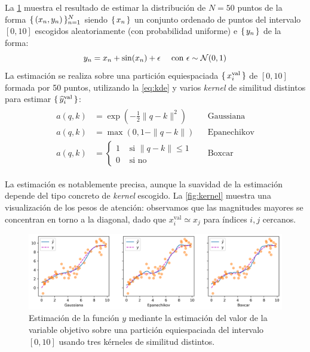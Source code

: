 La \cref{fig:regression} muestra el resultado de estimar la distribución de \( N = 50 \) puntos de la forma \( \{\,(x_{n}, y_{n})\,\}_{n = 1}^N \) siendo \( \{\,x_{n}\,\} \) un conjunto ordenado de puntos del intervalo \( [0, 10] \) escogidos aleatoriamente (con probabilidad uniforme) e \( \{\,y_n\,\} \) de la forma: 
\[
    y_{n} = x_{n} + \sin(x_{n}) + \epsilon \quad \text{ con \( \epsilon \sim \mathcal{N}(0, 1)\)}
\]
La estimación se realiza sobre una partición equiespaciada \( \{\,x^\text{val}_{i}\,\} \) de \( [0, 10] \) formada por 50 puntos, utilizando la \cref{eq:kde} y varios \textit{kernel} de similitud distintos para estimar \( \{\,\widehat{y}^\text{val}_{i}\,\} \):
\[
    \begin{split}\begin{aligned}
    a(q, k) & = \exp\left(-\frac{1}{2} \|q - k\|^2 \right) && \mathrm{Gaussiana} \\
    a(q, k) & = \max\left(0, 1 - \|q - k\|\right) && \mathrm{Epanechikov} \\
    a(q, k) & = \begin{cases}
        1 &\text{ si } \|q - k\| \leq 1 \\
        0 &\text{ si no}
    \end{cases} && \mathrm{Boxcar}
    \end{aligned}\end{split}
\]

La estimación es notablemente precisa, aunque la suavidad de la estimación depende del tipo concreto de \textit{kernel} escogido. La \cref{fig:kernel} muestra una visualización de los pesos de atención: observamos que las magnitudes mayores se concentran en torno a la diagonal, dado que \( x^\text{val}_{i} \simeq x_j \) para índices \( i, j \) cercanos. 

\begin{figure}[tb]
    \centering
    \includegraphics[width=\textwidth]{figures/chapter4/graph.png}
    \caption{Estimación de la función \( y \) mediante la estimación del valor de la variable objetivo sobre una partición equiespaciada del intervalo \( [0, 10] \) usando tres kérneles de similitud distintos.}
    \label{fig:regression}
\end{figure}


